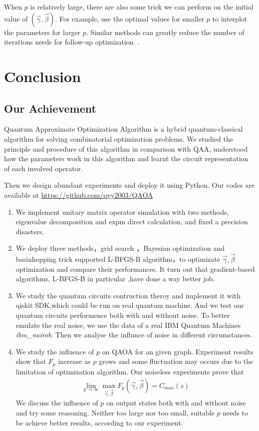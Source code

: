 \documentclass{./source/Report}
\begin{document}
When $p$ is relatively large, there are also some trick we can perform on the initial value of 
$(\vec{\gamma}, \vec{\beta})$. For example, use the optimal values for smaller $p$ to interplot the parameters for larger $p$.
Similar methods can greatly reduce the number of iterations needs for follow-up optimization~\cite{Zhou_2020}.




\section{Conclusion}

\subsection{Our Achievement}
Quantum Approximate Optimization Algorithm is a hybrid quantum-classical algorithm for solving combinatorial optimization problems. We studied the principle and procedure of this algorithm in comparison with QAA, understood how the parameters work in this algorithm and learnt the circuit representation of each involved operator.

Then we design abundant experiments and deploy it using Python. Our codes are available at  \href{https://github.com/qyy2003/QAOA}{https://github.com/qyy2003/QAOA}

\begin{enumerate}
    \item We implement unitary matrix operator simulation with two methods, eigenvalue decomposition and expm direct calculation, and fixed a precision disasters.
    \item We deploy three methods，grid search ，Bayesian optimization and  basinhopping trick supported L-BFGS-B algorithm，to optimizate $\vec{\gamma}, \vec{\beta}$ optimization and compare their performances. It turn out that gradient-based algorithms, L-BFGS-B in particular ,have done a way better job.
    \item We study the quantum circuits contruction theroy and implement it with qiskit SDK,which could be run on real quantum machine. And we test our quantum circuits performence both with and without noise. To better emulate the real noise, we use the data of a real IBM  Quantum Machines \textit{ibm\_nairob}. Then we analyse the influnce of noise in different circumstances.
    \item  We study the influence of $p$ on QAOA for an given graph. Experiment results show that $F_p$ increase as $p$ grows and some fluctuation may occurs due to the limitation of optimization algorithm. Our noiseless experiments prove that
    \begin{align*}
    \lim_{p\rightarrow \infty}\max_{\vec{\gamma}, \vec{\beta}}{F_p(\vec{\gamma}, \vec{\beta})}=C_{max}(z)
    \end{align*}
    We discuss the influence of $p$ on output states both with and without noise and try some reasoning. 
    Neither too large nor too small, suitable $p$ needs to be achieve better results, according to our experiment.
\end{enumerate}
\end{document}
